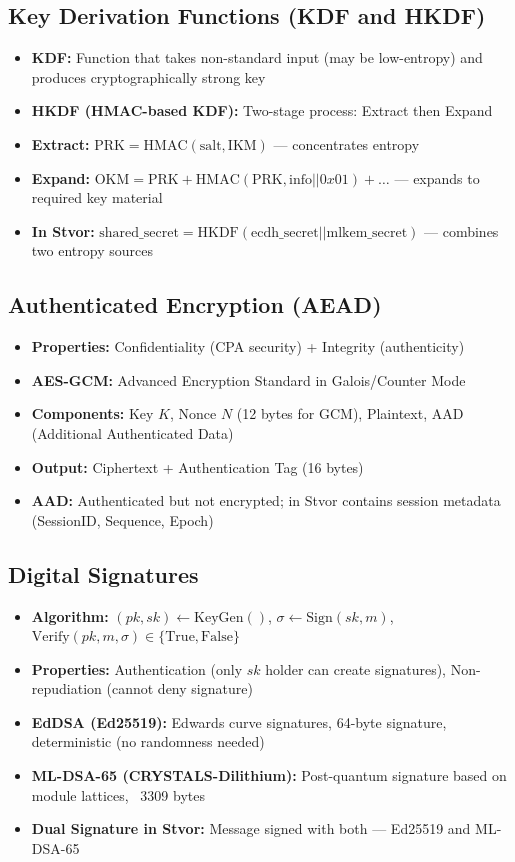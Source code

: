 \documentclass[11pt,a4paper,oneside]{book}
\begin{document}
\vspace{-0.2cm}\subsection{Key Derivation Functions (KDF and HKDF)}
\begin{itemize}
  \item \textbf{KDF:} Function that takes non-standard input (may be low-entropy) and produces cryptographically strong key
  \item \textbf{HKDF (HMAC-based KDF):} Two-stage process: Extract then Expand
  \item \textbf{Extract:} $\text{PRK} = \text{HMAC}(\text{salt}, \text{IKM})$ — concentrates entropy
  \item \textbf{Expand:} $\text{OKM} = \text{PRK} + \text{HMAC}(\text{PRK}, \text{info} || 0x01) + \ldots$ — expands to required key material
  \item \textbf{In Stvor:} $\text{shared\_secret} = \text{HKDF}(\text{ecdh\_secret} || \text{mlkem\_secret})$ — combines two entropy sources
\end{itemize}
\vspace{-0.2cm}\subsection{Authenticated Encryption (AEAD)}
\begin{itemize}
  \item \textbf{Properties:} Confidentiality (CPA security) + Integrity (authenticity)
  \item \textbf{AES-GCM:} Advanced Encryption Standard in Galois/Counter Mode
  \item \textbf{Components:} Key $K$, Nonce $N$ (12 bytes for GCM), Plaintext, AAD (Additional Authenticated Data)
  \item \textbf{Output:} Ciphertext + Authentication Tag (16 bytes)
  \item \textbf{AAD:} Authenticated but not encrypted; in Stvor contains session metadata (SessionID, Sequence, Epoch)
\end{itemize}
\vspace{-0.2cm}\subsection{Digital Signatures}
\begin{itemize}
  \item \textbf{Algorithm:} $(pk, sk) \leftarrow \text{KeyGen}()$, $\sigma \leftarrow \text{Sign}(sk, m)$, $\text{Verify}(pk, m, \sigma) \in \{\text{True}, \text{False}\}$
  \item \textbf{Properties:} Authentication (only $sk$ holder can create signatures), Non-repudiation (cannot deny signature)
  \item \textbf{EdDSA (Ed25519):} Edwards curve signatures, 64-byte signature, deterministic (no randomness needed)
  \item \textbf{ML-DSA-65 (CRYSTALS-Dilithium):} Post-quantum signature based on module lattices, ~3309 bytes
  \item \textbf{Dual Signature in Stvor:} Message signed with both — Ed25519 and ML-DSA-65
\end{itemize}
\end{document}
